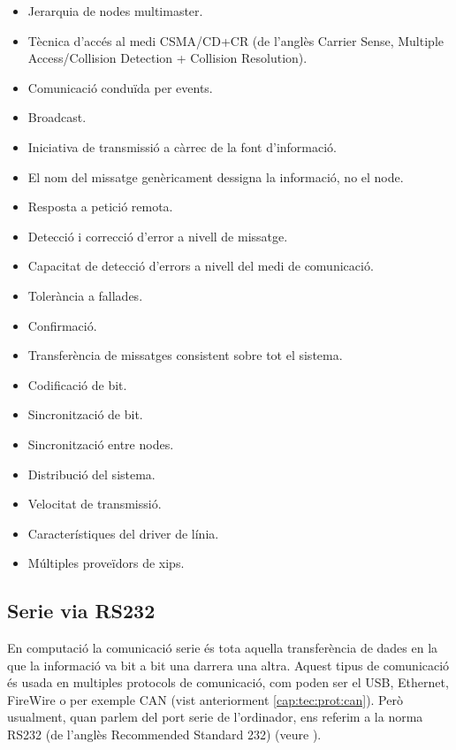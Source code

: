 \begin{itemize}
	\item Jerarquia de nodes multimaster.
	\item Tècnica d'accés al medi CSMA/CD+CR (de l'anglès Carrier Sense, Multiple Access/Collision Detection + Collision Resolution).
	\item Comunicació conduïda per events.
	\item Broadcast.
	\item Iniciativa de transmissió a càrrec de la font d'informació.
	\item El nom del missatge genèricament dessigna la informació, no el node.
	\item Resposta a petició remota.
	\item Detecció i correcció d'error a nivell de missatge.
	\item Capacitat de detecció d'errors a nivell del medi de comunicació.
	\item Tolerància a fallades.
	\item Confirmació.
	\item Transferència de missatges consistent sobre tot el sistema.
	\item Codificació de bit.
	\item Sincronització de bit.
	\item Sincronització entre nodes.
	\item Distribució del sistema.
	\item Velocitat de transmissió.
	\item Característiques del driver de línia.
	\item Múltiples proveïdors de xips.
\end{itemize}

\subsection{Serie via RS232}\label{cap:tec:prot:rs232}

En computació la comunicació serie és tota aquella transferència de dades en la que la informació va bit a bit una darrera una altra. Aquest tipus de comunicació és usada en multiples protocols de comunicació, com poden ser el USB, Ethernet, FireWire o per exemple CAN (vist anteriorment \ref{cap:tec:prot:can}). Però usualment, quan parlem del port serie de l'ordinador, ens referim a la norma RS232 (de l'anglès Recommended Standard 232) (veure \cite{Wikipedia2012}).

